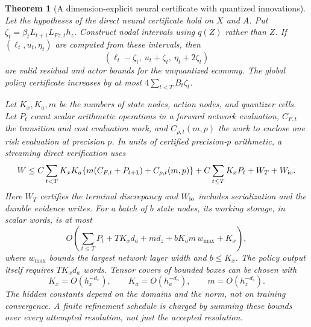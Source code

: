 \documentclass[ecta,nameyear,draft]{econsocart}
\newtheorem{theorem}{Theorem}
\theoremstyle{definition}
\theoremstyle{remark}
\begin{document}
\begin{theorem}[A dimension-explicit neural certificate with quantized innovations]
\label{thm:r41dimension}
Let the hypotheses of the direct neural certificate hold on $X$ and $A$.
Put $\zeta_t=\beta_t L_{t+1}L_{Fz,t}h_z$. Construct nodal intervals using
$q(Z)$ rather than $Z$. If $(\ell_t,u_t,\eta_t)$ are computed from these
intervals, then
\[
 (\ell_t-\zeta_t,\ u_t+\zeta_t,\ \eta_t+2\zeta_t)
\]
are valid residual and actor bounds for the unquantized economy. The global
policy certificate increases by at most $4\sum_{t<T}B_t\zeta_t$.

Let $K_x,K_a,m$ be the numbers of state nodes, action nodes, and quantizer
cells. Let $P_t$ count scalar arithmetic operations in a forward network
evaluation, $C_{F,t}$ the transition and cost evaluation work, and
$C_{\rho,t}(m,p)$ the work to enclose one risk evaluation at precision $p$.
In units of certified precision-$p$ arithmetic, a streaming direct
verification uses
\begin{align*}
 W\leq C\sum_{t<T}K_xK_a
 \{m(C_{F,t}+P_{t+1})+C_{\rho,t}(m,p)\}
 +C\sum_{t\leq T}K_xP_t+W_T+W_{\rm io}.
\end{align*}
Here $W_T$ certifies the terminal discrepancy and $W_{\rm io}$ includes
serialization and the durable evidence writes. For a batch of $b$ state
nodes, its working storage, in scalar words, is at most
\[
 O\!\left(\sum_{t\leq T}P_t+TK_xd_a+md_z+
 bK_am\,w_{\max}+K_x\right),
\]
where $w_{\max}$ bounds the largest network layer width and $b\leq K_x$.
The policy output itself requires $TK_xd_a$ words. Tensor covers of bounded
boxes can be chosen with
\[
 K_x=O(h_x^{-d_x}),\qquad K_a=O(h_a^{-d_a}),\qquad
 m=O(h_z^{-d_z}).
\]
The hidden constants depend on the domains and the norm, not on training
convergence. A finite refinement schedule is charged by summing these
bounds over every attempted resolution, not just the accepted resolution.
\end{theorem}
\end{document}
